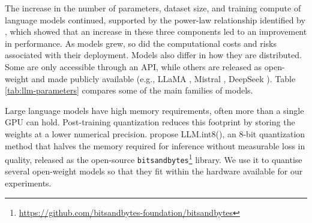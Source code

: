 The increase in the number of parameters, dataset size, and training compute of language models continued, supported by the power-law relationship identified by \textcite{kaplan2020scalinglawsneurallanguage}, which showed that an increase in these three components led to an improvement in performance. As models grew, so did the computational costs and risks associated with their deployment. Models also differ in how they are distributed. Some are only accessible through an API, while others are released as open-weight and made publicly available (e.g., LLaMA \cite{grattafiori2024llama3herdmodels}, Mistral \cite{jiang2023mistral7b}, DeepSeek \cite{deepseekai2025deepseekv32pushingfrontieropen}). Table \ref{tab:llm-parameters} compares some of the main families of models.

Large language models have high memory requirements, often more than a single GPU can hold. Post-training quantization reduces this footprint by storing the weights at a lower numerical precision. \textcite{dettmers2022llmint88bitmatrixmultiplication} propose LLM.int8(), an 8-bit quantization method that halves the memory required for inference without measurable loss in quality, released as the open-source \texttt{bitsandbytes}\footnote{\url{https://github.com/bitsandbytes-foundation/bitsandbytes}} library. We use it to quantise several open-weight models so that they fit within the hardware available for our experiments.


